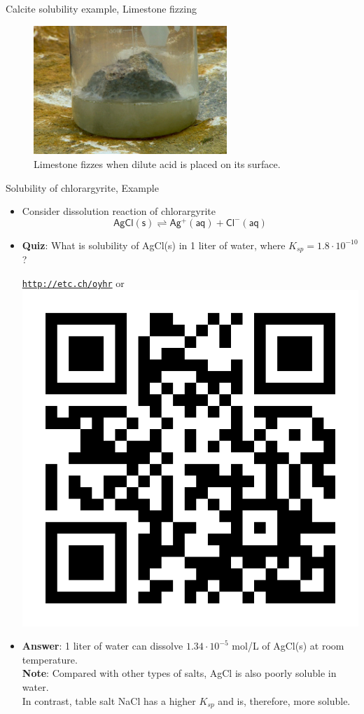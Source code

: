 \begin{frame}{Calcite solubility example,  Limestone fizzing}

\vskip 10pt
\begin{figure}
\centering
\includegraphics[width=0.65\textwidth]{figures/chemical-equilibrium/limestone-fizzing.jpg}
\caption{Limestone fizzes when dilute acid is placed on its surface.}
\end{figure}

\end{frame}
%
%
\begin{frame}{Solubility of chlorargyrite, Example}
	\begin{itemize}
		\item Consider dissolution reaction of chlorargyrite 
		\[
		\mathsf{AgCl(s) \rightleftharpoons Ag^{+}(aq) + Cl^{-}(aq)}
		\]
		\item  \alert{\bf Quiz}: What is solubility of AgCl(s) in 1 liter of water, where $K_{sp} = 1.8 \cdot 10^{-10}$?
		\begin{center}
			\href{http://etc.ch/oyhr}{\textcolor{indigo(dye)}{\tt http://etc.ch/oyhr}} 
			\quad
			or 
			\quad
			\includegraphics[height=0.2\columnwidth]{figures/chemical-equilibrium/poll-mass-balance.png}
		\end{center}
		\hiddenpause
		\item {\bf Answer}: 1 liter of water can dissolve $1.34 \cdot 10^{-5}$ mol/L of AgCl(s) at room temperature. \\
		{\bf Note}: Compared with other types of salts, AgCl is also poorly soluble in water. \\
		In contrast, table salt NaCl has a higher $K_{sp}$ and is, therefore, more soluble.
	\end{itemize}
\end{frame}		
